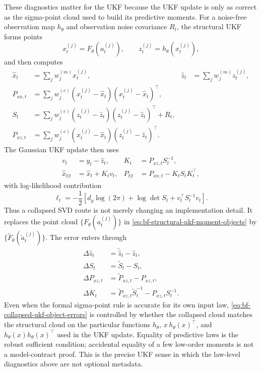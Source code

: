 These diagnostics matter for the UKF because the UKF update is only as correct
as the sigma-point cloud used to build its predictive moments.  For a
noise-free observation map $h_\theta$ and observation noise covariance $R_t$,
the structural UKF forms points
\[
  x_t^{(j)}=F_\theta(a_t^{(j)}),
  \qquad
  z_t^{(j)}=h_\theta(x_t^{(j)}),
\]
and then computes
\begin{align}
  \hat x_t
    &=\sum_j w_j^{(m)}x_t^{(j)},&
  \hat z_t
    &=\sum_j w_j^{(m)}z_t^{(j)},\\
  P_{xx,t}
    &=\sum_j w_j^{(c)}
      (x_t^{(j)}-\hat x_t)(x_t^{(j)}-\hat x_t)^\top,\\
  S_t
    &=\sum_j w_j^{(c)}
      (z_t^{(j)}-\hat z_t)(z_t^{(j)}-\hat z_t)^\top + R_t,\\
  P_{xz,t}
    &=\sum_j w_j^{(c)}
      (x_t^{(j)}-\hat x_t)(z_t^{(j)}-\hat z_t)^\top .
    \label{eq:bf-structural-ukf-moment-objects}
\end{align}
The Gaussian UKF update then uses
\begin{align}
  v_t &= y_t-\hat z_t,&
  K_t &= P_{xz,t}S_t^{-1},\\
  \hat x_{t|t}
    &= \hat x_t+K_tv_t,&
  P_{t|t}
    &= P_{xx,t}-K_tS_tK_t^\top,
    \label{eq:bf-structural-ukf-update-objects}
\end{align}
with log-likelihood contribution
\begin{equation}
  \ell_t
  =
  -\frac12
  \left[
    d_y\log(2\pi)+\log\det S_t+v_t^\top S_t^{-1}v_t
  \right].
  \label{eq:bf-structural-ukf-loglik-object}
\end{equation}
Thus a collapsed SVD route is not merely changing an implementation detail.
It replaces the point cloud
$\{F_\theta(a_t^{(j)})\}$ in
\eqref{eq:bf-structural-ukf-moment-objects} by
$\{\widetilde F_\theta(\widetilde a_t^{(j)})\}$.  The error enters through
\begin{align}
  \Delta\hat z_t
    &= \widetilde{\hat z}_t-\hat z_t,\\
  \Delta S_t
    &= \widetilde S_t-S_t,\\
  \Delta P_{xz,t}
    &= \widetilde P_{xz,t}-P_{xz,t},\\
  \Delta K_t
    &= \widetilde P_{xz,t}\widetilde S_t^{-1}
      -P_{xz,t}S_t^{-1}.
    \label{eq:bf-collapsed-ukf-object-errors}
\end{align}
Even when the formal sigma-point rule is accurate for its own input law,
\eqref{eq:bf-collapsed-ukf-object-errors} is controlled by whether the
collapsed cloud matches the structural cloud on the particular functions
$h_\theta$, $x\,h_\theta(x)^\top$, and
$h_\theta(x)h_\theta(x)^\top$ used in the UKF update.  Equality of predictive
laws is the robust sufficient condition; accidental equality of a few low-order
moments is not a model-contract proof.  This is the precise UKF sense in which
the law-level diagnostics above are not optional metadata.

